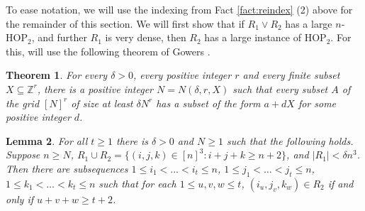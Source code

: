 \documentclass[12pt,oneside,british,a4wide]{amsart}
\newtheorem{theorem}{Theorem}[section]
\newtheorem{lemma}[theorem]{Lemma}
\numberwithin{equation}{section}
\theoremstyle{definition}
\def\HOP{\mathrm{HOP}}
\begin{document}
To ease notation, we will use the indexing from Fact \ref{fact:reindex} (2) above for the remainder of this section.  We will first show that if $R_1\vee R_2$ has a large $n$-$\HOP_2$, and further $R_1$ is very dense, then $R_2$ has a large instance of $\HOP_2$.  For this, will use the following theorem of Gowers \cite[Theorem 10.3]{Gowers.2007}.

\begin{theorem}\label{thm:G} For every  $\delta> 0$, every positive integer $r$ and every finite subset $X \subseteq \mathbb{Z}^r$, there is a positive integer $N=N(\delta,r,X)$ such that every subset $A$ of
the grid $[N]^r$ of size at least $\delta N^r$ has a subset of the form $a + dX$ for some positive integer $d$.
\end{theorem}

\begin{lemma}\label{lem:almostallramsey}
For all $t\geq 1$ there is $\delta>0$ and $N\geq 1$ such that the following holds.  Suppose $n\geq N$, $R_1\cup R_2=\{(i,j,k)\in [n]^3: i+j+k\geq n+2\}$, and $|R_1|<\delta n^3$.  Then there are subsequences $1\leq i_1<\ldots<i_t\leq n$, $1\leq j_1<\ldots<j_t\leq n$, $1\leq k_1<\ldots<k_t\leq n$ such that for each $1\leq u,v,w\leq t$, $(i_u,j_v,k_w)\in R_2$ if and only if $u+v+w\geq t+2$.
\end{lemma}
\end{document}
